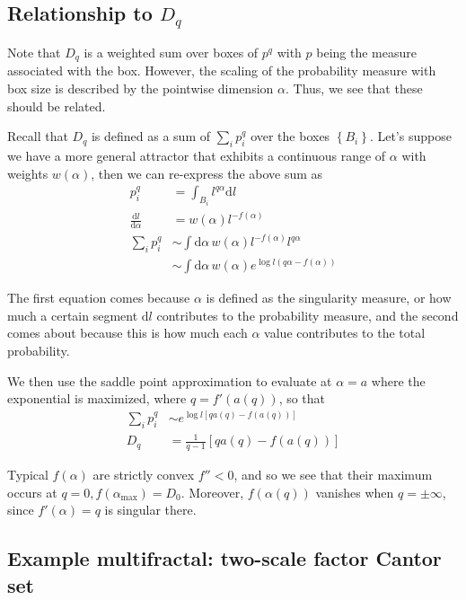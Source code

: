 \documentclass[12pt]{article}
\newcommand{\rd}[2]{\frac{\mathrm{d}#1}{\mathrm{d}#2}}
\begin{document}
\subsection{Relationship to $D_q$}

Note that $D_q$ is a weighted sum over boxes of $p^q$ with $p$ being the measure
associated with the box. However, the scaling of the probability measure with
box size is described by the pointwise dimension $\alpha$. Thus, we see that
these should be related.

Recall that $D_q$ is defined as a sum of $\sum\limits_{i}^{}p_i^q$ over the
boxes $\left\{ B_i \right\}$. Let's suppose we have a more general attractor
that exhibits a continuous range of $\alpha$ with weights $w(\alpha)$, then we
can re-express the above sum as
\begin{align}
    p_i^q &= \int_{B_i} l^{q\alpha}\mathrm{d}l\\
    \rd{l}{\alpha} &= w(\alpha)l^{-f(\alpha)}\\
    \sum\limits_{i}^{} p_i^q &\sim
        \int \mathrm{d}\alpha\, w(\alpha) l^{-f(\alpha)} l^{q\alpha}\\
        &\sim
        \int \mathrm{d}\alpha\, w(\alpha) e^{\log l(q\alpha - f(\alpha))}
\end{align}

The first equation comes because $\alpha$ is defined as the singularity measure,
or how much a certain segment $\mathrm{d}l$ contributes to the probability
measure, and the second comes about because this is how much each $\alpha$
value contributes to the total probability.

We then use the saddle point approximation to evaluate at $\alpha = a$ where the
exponential is maximized, where $q = f'(a(q))$, so that
\begin{align}
    \sum\limits_{i}^{}p_i^q &\sim e^{\log l\left[ qa(q) - f(a(q)) \right]}\\
    D_q &= \frac{1}{q-1}\left[ q a(q) - f(a(q)) \right]
\end{align}

Typical $f(\alpha)$ are strictly convex $f'' < 0$, and so we see that their
maximum occurs at $q=0, f(\alpha_{\max}) = D_0$. Moreover, $f(\alpha(q))$
vanishes when $q = \pm \infty$, since $f'(\alpha) = q$ is singular there.

\subsection{Example multifractal: two-scale factor Cantor set}
\end{document}
